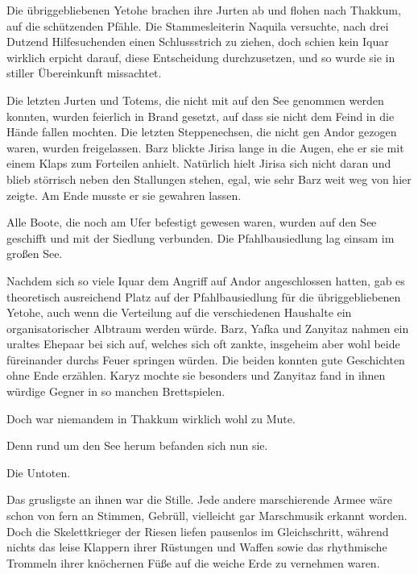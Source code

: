 Die übriggebliebenen Yetohe brachen ihre Jurten ab und flohen nach Thakkum, auf die schützenden Pfähle. Die Stammesleiterin Naquila versuchte, nach drei Dutzend Hilfesuchenden einen Schlussstrich zu ziehen, doch schien kein Iquar wirklich erpicht darauf, diese Entscheidung durchzusetzen, und so wurde sie in stiller Übereinkunft missachtet.

Die letzten Jurten und Totems, die nicht mit auf den See genommen werden konnten, wurden feierlich in Brand gesetzt, auf dass sie nicht dem Feind in die Hände fallen mochten. Die letzten Steppenechsen, die nicht gen Andor gezogen waren, wurden freigelassen. Barz blickte Jirisa lange in die Augen, ehe er sie mit einem Klaps zum Forteilen anhielt. Natürlich hielt Jirisa sich nicht daran und blieb störrisch neben den Stallungen stehen, egal, wie sehr Barz weit weg von hier zeigte. Am Ende musste er sie gewahren lassen.

Alle Boote, die noch am Ufer befestigt gewesen waren, wurden auf den See geschifft und mit der Siedlung verbunden. Die Pfahlbausiedlung lag einsam im großen See.

Nachdem sich so viele Iquar dem Angriff auf Andor angeschlossen hatten, gab es theoretisch ausreichend Platz auf der Pfahlbausiedlung für die übriggebliebenen Yetohe, auch wenn die Verteilung auf die verschiedenen Haushalte ein organisatorischer Albtraum werden würde. Barz, Yafka und Zanyitaz nahmen ein uraltes Ehepaar bei sich auf, welches sich oft zankte, insgeheim aber wohl beide füreinander durchs Feuer springen würden. Die beiden konnten gute Geschichten ohne Ende erzählen. Karyz mochte sie besonders und Zanyitaz fand in ihnen würdige Gegner in so manchen Brettspielen.

Doch war niemandem in Thakkum wirklich wohl zu Mute.

Denn rund um den See herum befanden sich nun sie.

Die Untoten.

Das grusligste an ihnen war die Stille. Jede andere marschierende Armee wäre schon von fern an Stimmen, Gebrüll, vielleicht gar Marschmusik erkannt worden. Doch die Skelettkrieger der Riesen liefen pausenlos im Gleichschritt, während nichts das leise Klappern ihrer Rüstungen und Waffen sowie das rhythmische Trommeln ihrer knöchernen Füße auf die weiche Erde zu vernehmen waren.

